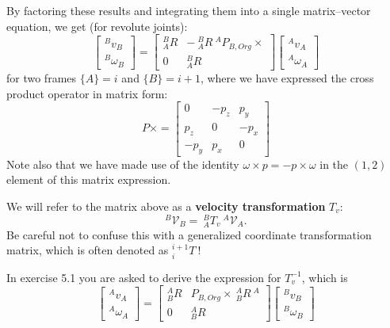 \documentclass[]{article}
\begin{document}
By factoring these results and integrating them into a single matrix--vector equation, we get (for revolute joints):
\begin{displaymath}
\left[\begin{array}{c}^{B}v_{B} \\ ^{B}\omega_{B}\end{array}\right] = \left[\begin{array}{cc}^{B}_{A}R & -\ \!^{B}_{A}R\ \!^{A}P_{B,Org}\!\times \\ 0 & ^{B}_{A}R\end{array}\right]\left[\begin{array}{c}^{A}v_{A} \\ ^{A}\omega_{A}\end{array}\right]
\end{displaymath}
for two frames $\{A\}=i$ and $\{B\}=i+1$, where we have expressed the cross product operator in matrix form:
\begin{displaymath}
P\!\times = \left[\begin{array}{ccc} 0 & -p_{z} & p_{y} \\ p_{z} & 0 & -p_{x} \\ -p_{y} & p_{x} & 0 \end{array}\right]
\end{displaymath}
Note also that we have made use of the identity $\omega \times p = -p \times \omega$ in the $(1,2)$ element of this matrix expression.

We will refer to the matrix above as a \textbf{velocity transformation} $T_{v}$:
\begin{displaymath}
^{B}\mathcal{V}_{B} = \ \!^{B}_{A}T_{v}\ \!^{A}\mathcal{V}_{A}.
\end{displaymath}
 Be careful not to confuse this with a generalized coordinate transformation matrix, which is often denoted as $^{i+1}_{i}T\ $!

In exercise 5.1 you are asked to derive the expression for $T_{v}^{-1}$, which is
\begin{displaymath}
\left[\begin{array}{c}^{A}v_{A} \\ ^{A}\omega_{A}\end{array}\right] = \left[\begin{array}{cc}^{A}_{B}R & P_{B,Org}\!\times\ \!^{A}_{B}R\ \!^{A} \\ 0 & ^{A}_{B}R\end{array}\right]\left[\begin{array}{c}^{B}v_{B} \\ ^{B}\omega_{B}\end{array}\right]
\end{displaymath}
\end{document}
